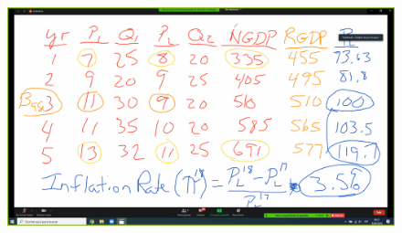 \documentclass[openany]{book}
\begin{document}
\begin{figure}[H]
    \centering
    \includegraphics[width=14cm]{figs/Captura2.png} 
\end{figure}




\end{document}
